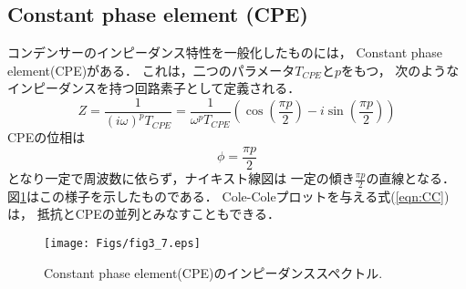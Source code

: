 \subsection{Constant phase element (CPE)}
コンデンサーのインピーダンス特性を一般化したものには，
Constant phase element(CPE)がある．
これは，二つのパラメータ$T_{CPE}$と$p$をもつ，
次のようなインピーダンスを持つ回路素子として定義される．
\begin{equation}
	Z=\frac{1}{(i\omega)^pT_{CPE}}
	=\frac{1}{\omega^p T_{CPE}} 
	\left( 
		\cos\left(\frac{\pi p}{2}\right) 
		-
		i
		\sin\left(\frac{\pi p}{2}\right) 
	\right)
	\label{eqn:Z_CPE}
\end{equation}
CPEの位相は
\begin{equation}
	\phi=\frac{\pi p}{2}
	\label{eqn:}
\end{equation}
となり一定で周波数に依らず，ナイキスト線図は
一定の傾き$\frac{\pi p}{2}$の直線となる．
図\ref{fig:fig3_7}はこの様子を示したものである．
Cole-Coleプロットを与える式(\ref{eqn:CC})は，
抵抗とCPEの並列とみなすこともできる．
\begin{figure}[h]
	\begin{center}
	\texttt{[image: Figs/fig3\_7.eps]} 
	\end{center}
	\caption{
		Constant phase element(CPE)のインピーダンススペクトル.
	} 
	\label{fig:fig3_7}
\end{figure}
